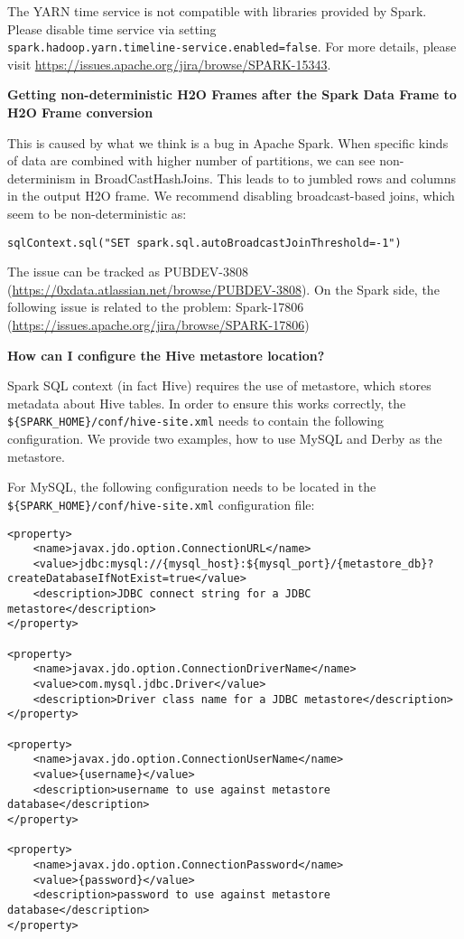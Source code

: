 The YARN time service is not compatible with libraries provided by Spark. Please disable time service via setting \\
\texttt{spark.hadoop.yarn.timeline-service.enabled=false}.
For more details, please visit \url{https://issues.apache.org/jira/browse/SPARK-15343}.

\textbf{Getting non-deterministic H2O Frames after the Spark Data Frame to H2O Frame conversion}

This is caused by what we think is a bug in Apache Spark. When specific kinds of data are combined with higher number of partitions, we can see non-determinism in BroadCastHashJoins. This leads to to jumbled rows and columns in the output H2O frame. We recommend disabling broadcast-based joins, which seem to be non-deterministic as:

\begin{lstlisting}[style=Scala]
sqlContext.sql("SET spark.sql.autoBroadcastJoinThreshold=-1")
\end{lstlisting}

The issue can be tracked as PUBDEV-3808 (\url{https://0xdata.atlassian.net/browse/PUBDEV-3808}). On the Spark side, the following issue is related to the problem: Spark-17806 (\url{https://issues.apache.org/jira/browse/SPARK-17806})

\textbf{How can I configure the Hive metastore location?}

Spark SQL context (in fact Hive) requires the use of metastore, which stores metadata about Hive tables. In order to ensure this works correctly, the {\lstinline[style=Bash]|${SPARK_HOME}/conf/hive-site.xml|} needs to contain the following configuration. We provide two examples, how to use MySQL and Derby as the metastore.

For MySQL, the following configuration needs to be located in the {\lstinline[style=Bash]|${SPARK_HOME}/conf/hive-site.xml|} configuration file:

\begin{lstlisting}[style=Bash]
<property>
    <name>javax.jdo.option.ConnectionURL</name>
    <value>jdbc:mysql://{mysql_host}:${mysql_port}/{metastore_db}?createDatabaseIfNotExist=true</value>
    <description>JDBC connect string for a JDBC metastore</description>
</property>

<property>
    <name>javax.jdo.option.ConnectionDriverName</name>
    <value>com.mysql.jdbc.Driver</value>
    <description>Driver class name for a JDBC metastore</description>
</property>

<property>
    <name>javax.jdo.option.ConnectionUserName</name>
    <value>{username}</value>
    <description>username to use against metastore database</description>
</property>

<property>
    <name>javax.jdo.option.ConnectionPassword</name>
    <value>{password}</value>
    <description>password to use against metastore database</description>
</property>
\end{lstlisting}

